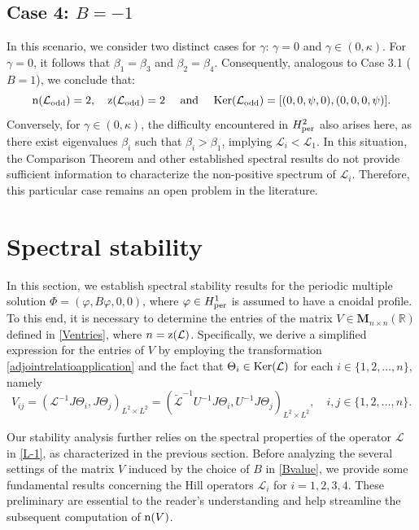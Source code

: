 \documentclass[10pt,reqno,a4paper]{amsart} %
\theoremstyle{definition} %
\numberwithin{equation}{section}
\numberwithin{figure}{section}
\begin{document}
\subsection*{Case 4: $B = -1$} 
In this scenario, we consider two distinct cases for $\gamma$: $\gamma = 0$ and $\gamma \in (0,\kappa)$. For $\gamma = 0$, it follows that $\beta_1 = \beta_3$ and $\beta_2 = \beta_4$. Consequently, analogous to Case 3.1 ($B=1$), we conclude that:
\begin{equation}\label{spectralanalysis-B-minus1-gamma0}
    {\rm n}(\mathcal{L}_{\rm odd}) = 2, \quad {\rm z}(\mathcal{L}_{\rm odd}) = 2 \quad \text{ and } \quad {\rm Ker}(\mathcal{L}_{\rm odd}) = [(0,0,\psi,0), (0,0,0,\psi)].
\end{equation}
Conversely, for $\gamma \in (0,\kappa)$, the difficulty encountered in $H^2_{\rm per}$ also arises here, as there exist eigenvalues $\beta_i$ such that $\beta_i > \beta_1$, implying $\mathcal{L}_i < \mathcal{L}_1$. In this situation, the Comparison Theorem and other established spectral results do not provide sufficient information to characterize the non-positive spectrum of $\mathcal{L}_i$. Therefore, this particular case remains an open problem in the literature.

\vspace{0.5cm}
\section{Spectral stability}\label{Spectral stability Section}
In this section, we establish spectral stability results for the periodic multiple solution $\Phi = (\varphi, B\varphi,0,0)$, where $\varphi \in H^1_{\rm per}$ is assumed to have a cnoidal profile. To this end, it is necessary to determine the entries of the matrix $V \in \mathbf{M}_{n \times n}(\mathbb{R})$ defined in \eqref{Ventries}, where $n ={\rm z}(\mathcal{L})$. Specifically, we derive a simplified expression for the entries of $V$ by employing the transformation \eqref{adjointrelatioapplication} and the fact that $\Theta_i \in {\rm Ker}(\mathcal{L})$ for each $i \in \{1, 2, \dots, n\}$, namely
\begin{equation}\label{VentriesExplicity}
V_{ij} = \left( \mathcal{L}^{-1} J \Theta_i, J \Theta_j \right)_{L^2 \times L^2} = \left( \tilde{\mathcal{L}}^{-1} U^{-1} J \Theta_i, U^{-1} J \Theta_j \right)_{L^2 \times L^2}, \quad i,j \in \{1, 2, \dots, n\}.
\end{equation}

Our stability analysis further relies on the spectral properties of the operator $\mathcal{L}$ in \eqref{L-1}, as characterized in the previous section. Before analyzing the several settings of the matrix $V$ induced by the choice of $B$ in \eqref{Bvalue}, we provide some fundamental results concerning the Hill operators $\mathcal{L}_i$ for $i=1,2,3,4$. These preliminary are essential to the reader’s understanding and help streamline the subsequent computation of  ${\rm n}(V)$.
\end{document}
